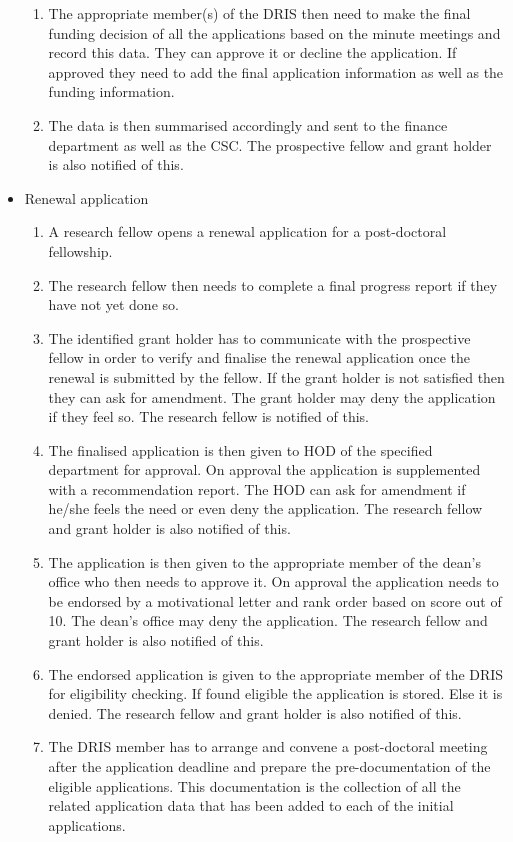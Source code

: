 \documentclass[12pt]{article}
\begin{document}
\begin{itemize}
\begin{enumerate}
			\item The appropriate member(s) of the DRIS then need to make the final funding decision of all the applications based on the minute meetings and record this data. They can approve it or decline the application. If approved they need to add the final application information as well as the funding information.
			\item The data is then summarised accordingly and sent to the finance department as well as the CSC. The prospective fellow and grant holder is also notified of this.   
		\end{enumerate}
	\item Renewal application
		\begin{enumerate}
			\item A research fellow opens a renewal application for a post-doctoral fellowship.
			\item The research fellow then needs to complete a final progress report if they have not yet done so.
			\item The identified grant holder has to communicate with the prospective fellow in order to verify and finalise the renewal application once the renewal is submitted by the fellow. If the grant holder is not satisfied then they can ask for amendment. The grant holder may deny the application if they feel so. The research fellow is notified of this.  
			\item The finalised application is then given to HOD of the specified department for approval. On approval the application is supplemented with a recommendation report. The HOD can ask for amendment if he/she feels the need or even deny the application. The research fellow and grant holder is also notified of this.  
			\item The application is then given to the appropriate member of the dean's office who then needs to approve it. On approval the application needs to be endorsed by a motivational letter and rank order based on score out of 10. The dean's office may deny the application. The research fellow and grant holder is also notified of this.  
			\item The endorsed application is given to the appropriate member of the DRIS for eligibility checking. If found eligible the application is stored. Else it is denied. The research fellow and grant holder is also notified of this.  
			\item The DRIS member has to arrange and convene a post-doctoral meeting after the application deadline and prepare the pre-documentation of the eligible applications. This documentation is the collection of all the related application data that has been added to each of the initial applications.

\end{enumerate}
\end{itemize}
\end{document}

